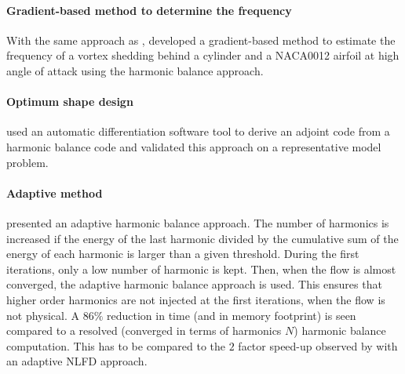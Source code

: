
\paragraph{Gradient-based method to determine the frequency}
With the same approach as \citet{McMullen2002}, \citet{Gopinath2006}
developed a gradient-based method to estimate the frequency of a 
vortex shedding behind a cylinder and a NACA0012 airfoil 
at high angle of attack using the harmonic balance approach.

\paragraph{Optimum shape design}
\citet{Thomas2005b} used an automatic 
differentiation software tool to derive an adjoint code
from a harmonic balance code and validated this approach
on a representative model problem.

\paragraph{Adaptive method}
\citet{Maple2004} presented an adaptive harmonic
balance approach. The number of harmonics is increased
if the energy of the last harmonic divided by the cumulative
sum of the energy of each harmonic is larger than a 
given threshold. During the first iterations, only
a low number of harmonic is kept. Then, when the flow
is almost converged, the adaptive harmonic balance
approach is used. This ensures that higher order harmonics
are not injected at the first iterations, when the
flow is not physical. A $86\%$ reduction in time (and
in memory footprint) is seen compared to a resolved (converged in
terms of harmonics $N$) harmonic
balance computation. This has to be compared to
the $2$ factor speed-up observed by \citet{Mosahebi2013}
with an adaptive NLFD approach.

